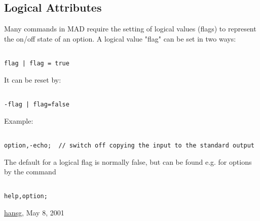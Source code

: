 




\subsection{Logical Attributes}
 Many commands in MAD require the setting of logical values (flags) to represent the on/off state of an option. A logical value "flag" can be set in two ways: 
\begin{verbatim}

flag | flag = true
\end{verbatim} It can be reset by: 
\begin{verbatim}

-flag | flag=false
\end{verbatim} Example: 
\begin{verbatim}

option,-echo;  // switch off copying the input to the standard output
\end{verbatim} The default for a logical flag is normally false, but can be found e.g. for options by the command  
\begin{verbatim}

help,option;
\end{verbatim}\href{http://www.cern.ch/Hans.Grote/hansg_sign.html}{hansg}, May 8, 2001 

